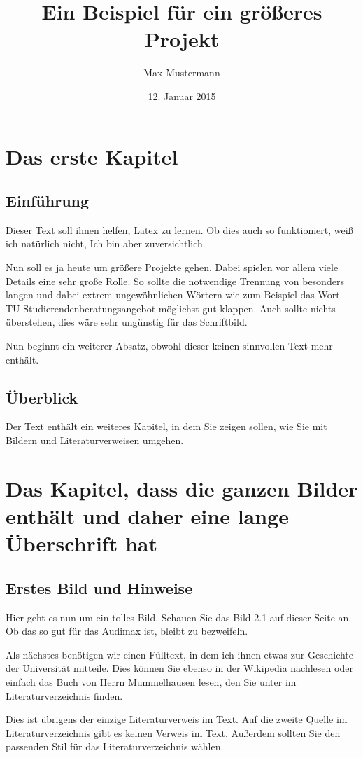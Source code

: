 \documentclass[12pt,a4paper, bibliography=totoc]{scrbook}
\title{Ein Beispiel für ein größeres Projekt}
\author{Max Mustermann}
\date{12. Januar 2015}
\begin{document}
\maketitle
\tableofcontents
\chapter{Das erste Kapitel}
\section*{Einführung}
Dieser Text soll ihnen helfen, Latex zu lernen. Ob dies auch so funktioniert,
weiß ich natürlich nicht, Ich bin aber zuversichtlich. 

Nun soll es ja heute um größere Projekte gehen. Dabei spielen vor allem viele
Details eine sehr große Rolle. So sollte die notwendige Trennung von besonders
langen und dabei extrem ungewöhnlichen Wörtern wie zum Beispiel das Wort TU-Studierendenberatungs\-angebot
möglichst gut klappen. Auch sollte nichts überstehen, dies wäre sehr ungünstig für das Schriftbild.

Nun beginnt ein weiterer Absatz, obwohl dieser keinen sinnvollen Text mehr enthält.
\section*{Überblick}
Der Text enthält ein weiteres Kapitel, in dem Sie zeigen sollen, wie Sie mit Bildern und
Literaturverweisen umgehen.
\chapter[Bilder]{Das Kapitel, dass die ganzen Bilder enthält und daher eine lange Überschrift hat}
\section{Erstes Bild und Hinweise}
Hier geht es nun um ein tolles Bild. Schauen Sie das Bild 2.1 auf dieser Seite an. Ob das so gut für das Audimax ist, bleibt zu bezweifeln.

Als nächstes benötigen wir einen Fülltext, in dem ich ihnen etwas zur Geschichte der Universität mitteile. Dies können Sie ebenso in der Wikipedia nachlesen oder einfach das Buch von Herrn Mummelhausen lesen, den Sie unter \cite{mummel} im Literaturverzeichnis finden.

Dies ist übrigens der einzige Literaturverweis im Text. Auf die zweite
Quelle im Literaturverzeichnis gibt es keinen Verweis im Text. Außerdem sollten Sie den passenden Stil für das Literaturverzeichnis wählen.
\end{document}
